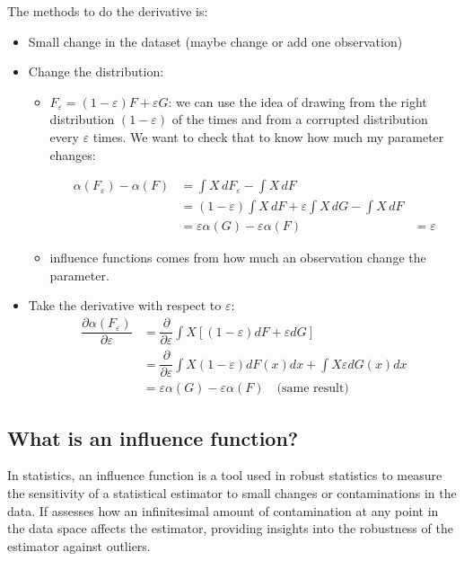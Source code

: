\documentclass{article}
\begin{document}
The methods to do the derivative is:
\begin{itemize}
    \item Small change in the dataset (maybe change or add one observation)
    \item Change the distribution:
    \begin{itemize}
        \item $F_\varepsilon = (1 - \varepsilon) F + \varepsilon G$: we can use the idea of drawing from the right distribution $(1 - \varepsilon)$ of the times and from a corrupted distribution every $\varepsilon$ times. We want to check that to know how much my parameter changes:
        
        \begin{align*}
            \alpha(F_\varepsilon) - \alpha(F)
            &= \int X \,dF_\varepsilon - \int X  \,dF \\
            &= (1 - \varepsilon) \int X \,dF + \varepsilon \int X \,dG - \int X  \,dF \\
            &= \varepsilon \alpha(G) - \varepsilon \alpha(F)
            &= \varepsilon
        \end{align*}
        \item influence functions comes from how much an observation change the parameter.
    \end{itemize}
    \item Take the derivative with respect to $\varepsilon$:
    \begin{align*}
        \dfrac{\partial \alpha (F_\varepsilon)}{\partial \varepsilon}
        &= \dfrac{\partial}{\partial \varepsilon} \int X \left[ (1 - \varepsilon) dF + 
        \varepsilon dG \right] \\
        &= \dfrac{\partial}{\partial \varepsilon} \int X (1 - \varepsilon) dF(x) dx + 
        \int X \varepsilon dG(x) dx \\
        &= \varepsilon \alpha(G) - \varepsilon \alpha(F) \quad \text{(same result)}
    \end{align*}
\end{itemize}

\subsection{What is an influence function?}

In statistics, an influence function is a tool used in robust statistics to measure the sensitivity of a statistical estimator to small changes or contaminations in the data. If assesses how an infinitesimal amount of contamination at any point in the data space affects the estimator, providing insights into the robustness of the estimator against outliers.
\end{document}
